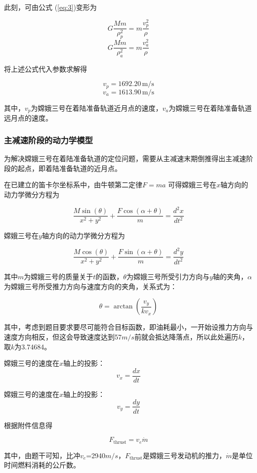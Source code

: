 \documentclass{ctexart}
\begin{document}
此刻，可由公式 (\ref{eq:3})变形为

\[G \frac{M m}{\rho_p^2} = m \frac{v_p^2}{\rho}\]
\[G \frac{M m}{\rho_a^2} = m \frac{v_a^2}{\rho}\]

将上述公式代入参数求解得

\[v_p = 1692.20 \, \text{m} / \text{s}\]
\[v_a = 1613.90 \, \text{m} / \text{s}\]

其中，\(v_p\)为嫦娥三号在着陆准备轨道近月点的速度，\(v_a\)为嫦娥三号在着陆准备轨道远月点的速度。

    \subsubsection{主减速阶段的动力学模型}
为解决嫦娥三号在着陆准备轨道的定位问题，需要从主减速末期倒推得出主减速阶段的起点，即着陆准备轨道的近月点。

在已建立的笛卡尔坐标系中，由牛顿第二定律\(F=ma\)
可得嫦娥三号在\(x\)轴方向的动力学微分方程为

\begin{equation}
\frac{M \sin(\theta)}{x^2 + y^2} + \frac{F \cos(\alpha + \theta)}{m} = \frac{d^2 x}{dt^2}
\end{equation}

嫦娥三号在\(y\)轴方向的动力学微分方程为

\begin{equation}
\frac{M \cos(\theta)}{x^2 + y^2} + \frac{F \sin(\alpha + \theta)}{m} = \frac{d^2 y}{dt^2}
\end{equation}

其中\(m\)为嫦娥三号的质量关于\(t\)的函数，\(\theta\)为嫦娥三号所受引力方向与\(y\)轴的夹角，\(\alpha\)为嫦娥三号所受推力方向与速度方向的夹角，关系式为：

\[\theta = \arctan \left( \frac{v_{y}}{{k}{v_{x}}} \right)\]

其中，考虑到题目要求要尽可能符合目标函数，即油耗最小，一开始设推力方向与速度方向相反，但这会导致速度达到57\(m/s\)前就会抵达降落点，所以此处遍历\(k\)，取\(k\)为3.74684。

嫦娥三号的速度在\(x\)轴上的投影：
\[v_x = \frac{dx}{dt}\]

嫦娥三号的速度在\(x\)轴上的投影：
\[v_y = \frac{dy}{dt}\]

根据附件信息得

\begin{equation}
F_{\text{thrust}} = v_e \dot{m}
\end{equation}

其中，由题干可知，比冲\(v_e\)=2940\(m/s\)，\(F_{\text{thrust}}\)是嫦娥三号发动机的推力，\(\dot{m}\)是单位时间燃料消耗的公斤数。
\end{document}
